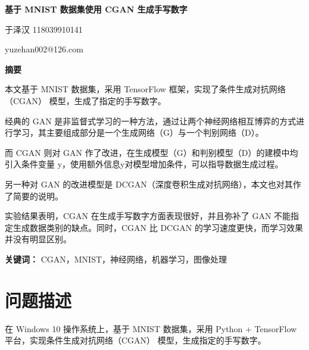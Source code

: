 \documentclass[a4paper, 12pt]{article}
\begin{document}


\setcounter{page}{1}

\begin{center}
{\textbf{基于 MNIST 数据集使用 CGAN 生成手写数字}}

\vspace{2\baselineskip}
{于泽汉 \hspace{1.5ex} 118039910141}

\vspace{1.5\baselineskip}

{yuzehan002@126.com}

\vspace{2\baselineskip}

{\textbf{摘要}}

\end{center}

本文基于 MNIST 数据集，采用 TensorFlow 框架，实现了条件生成对抗网络（CGAN） 模型，生成了指定的手写数字。

经典的 GAN 是非监督式学习的一种方法，通过让两个神经网络相互博弈的方式进行学习，其主要组成部分是一个生成网络（G）与一个判别网络（D）。

而 CGAN 则对 GAN 作了改进，在生成模型（G）和判别模型（D）的建模中均引入条件变量 y，使用额外信息y对模型增加条件，可以指导数据生成过程。

另一种对 GAN 的改进模型是 DCGAN（深度卷积生成对抗网络），本文也对其作了简要的说明。

实验结果表明，CGAN 在生成手写数字方面表现很好，并且弥补了 GAN 不能指定生成数据类别的缺点。同时，CGAN 比 DCGAN 的学习速度更快，而学习效果并没有明显区别。

\vspace{\baselineskip}

\textbf{关键词：} CGAN，MNIST，神经网络，机器学习，图像处理

\newpage


\section{问题描述}
在 Windows 10 操作系统上，基于 MNIST 数据集，采用 Python + TensorFlow 平台，实现条件生成对抗网络（CGAN） 模型，生成指定的手写数字。
\end{document}
